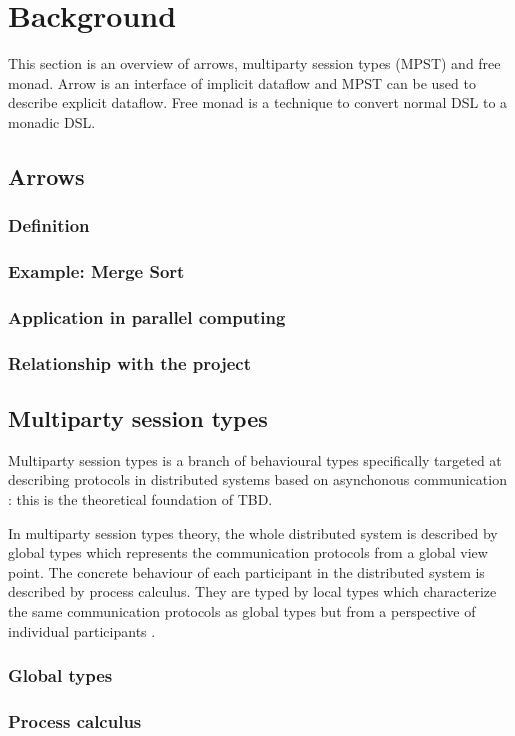 \chapter{Background}
This section is an overview of arrows, multiparty session types (MPST) and free monad. Arrow is an interface of implicit dataflow and MPST can be used to describe explicit dataflow. Free monad is a technique to convert normal DSL to a monadic DSL.
\section{Arrows}
\subsection{Definition}
\subsection{Example: Merge Sort}
\subsection{Application in parallel computing}
\subsection{Relationship with the project}
\section{Multiparty session types} 
Multiparty session types is a branch of behavioural types specifically targeted at describing protocols in distributed systems based on asynchonous communication \cite{coppoGentleIntroductionMultiparty2015}: this is the theoretical foundation of TBD.

In multiparty session types theory, the whole distributed system is described by global types which represents the communication protocols from a global view point. The concrete behaviour of each participant in the distributed system is described by process calculus. They are typed by local types which characterize the same communication protocols as global types but from a perspective of individual participants \cite{coppoGentleIntroductionMultiparty2015}. 
\subsection{Global types}
\subsection{Process calculus}
